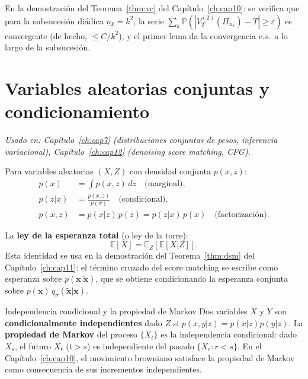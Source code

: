 En la demostración del Teorema~\ref{thm:vc} del Capítulo~\ref{ch:cap10}: se
verifica que para la subsucesión diádica $n_k = k^2$, la serie
$\sum_k\mathbb{P}(|V_T^{(2)}(\Pi_{n_k}) - T| \geq \varepsilon)$ es convergente
(de hecho, $\leq C/k^2$), y el primer lema da la convergencia c.s.\ a lo largo
de la subsucesión.

\section{Variables aleatorias conjuntas y condicionamiento}
\label{sec:ap_conjuntas}

\textit{Usado en: Capítulo~\ref{ch:cap7} (distribuciones conjuntas de pesos,
inferencia variacional), Capítulo~\ref{ch:cap12} (denoising score matching,
CFG).}

\medskip
Para variables aleatorias $(X,Z)$ con densidad conjunta $p(x,z)$:
\begin{align*}
  p(x) &= \int p(x,z)\,dz \quad \text{(marginal)}, \\
  p(z|x) &= \frac{p(x,z)}{p(x)} \quad \text{(condicional)}, \\
  p(x,z) &= p(x|z)\,p(z) = p(z|x)\,p(x) \quad \text{(factorización)}.
\end{align*}

La \textbf{ley de la esperanza total} (o ley de la torre):
\begin{equation}
  \mathbb{E}[X] = \mathbb{E}_Z[\mathbb{E}[X|Z]].
  \label{eq:ap_torre}
\end{equation}
Esta identidad se usa en la demostración del
Teorema~\ref{thm:dsm} del Capítulo~\ref{ch:cap11}: el término cruzado del score
matching se escribe como esperanza sobre $p(\bm{x}|\tilde{\bm{x}})$, que se
obtiene condicionando la esperanza conjunta sobre $p(\bm{x})\,q_\sigma
(\tilde{\bm{x}}|\bm{x})$.

\begin{observacion}{Independencia condicional y la propiedad de Markov}
Dos variables $X$ y $Y$ son \textbf{condicionalmente independientes} dado $Z$
si $p(x,y|z) = p(x|z)p(y|z)$. La \textbf{propiedad de Markov} del proceso
$\{X_t\}$ es la independencia condicional: dado $X_s$, el futuro $X_t$ ($t>s$)
es independiente del pasado $\{X_r:r<s\}$. En el Capítulo~\ref{ch:cap10},
el movimiento browniano satisface la propiedad de Markov como consecuencia
de sus incrementos independientes.
\end{observacion}

